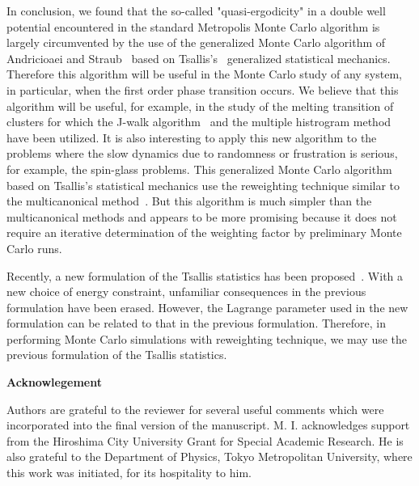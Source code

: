 In conclusion, we found that the so-called "quasi-ergodicity"
in a double well potential encountered in the standard Metropolis
Monte Carlo algorithm is largely circumvented by the
use of the generalized Monte Carlo algorithm of Andricioaei
and Straub~\cite{AS2,AS3} based on Tsallis's~\cite{TS} generalized
statistical mechanics. Therefore this algorithm will be useful
in the Monte Carlo study of any system, in particular, when
the first order phase transition occurs. We believe that
this algorithm will be useful, for example, in the study of
the melting transition of clusters for which the J-walk
algorithm~\cite{FFD} and the multiple histrogram
method~\cite{WA} have been utilized. It is also interesting
to apply this new algorithm to the problems where the slow
dynamics due to randomness or frustration is serious, for
example, the spin-glass problems. This generalized
Monte Carlo algorithm based on Tsallis's statistical mechanics
use the reweighting technique similar to the multicanonical
method~\cite{BN}. But this algorithm is much simpler than
the multicanonical methods and appears to be more promising
because it does not require an iterative determination of the
weighting factor by preliminary Monte Carlo runs.

Recently, a new formulation of the Tsallis statistics
has been proposed~\cite{TMP}. With a new choice of energy
constraint, unfamiliar consequences in the previous formulation
have been erased. However, the Lagrange parameter used
in the new formulation can be related to that in the previous
formulation. Therefore, in performing Monte Carlo simulations
with reweighting technique, we may use the previous formulation
of the Tsallis statistics.

\begin{flushleft}
{\Large \bf Acknowlegement}
\end{flushleft}

Authors are grateful to the reviewer for several useful comments
which were incorporated into the final version of the manuscript.
M. I. acknowledges support from the Hiroshima City University
Grant for Special Academic Research. He is also grateful
to the Department of Physics, Tokyo Metropolitan University,
where this work was initiated, for its hospitality to him.

